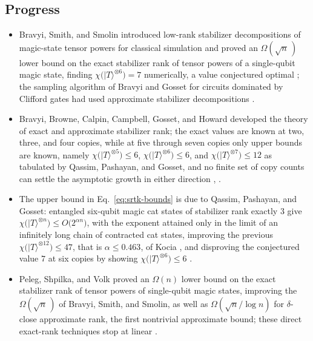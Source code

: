 \subsection*{Progress}

\begin{itemize}
  \item Bravyi, Smith, and Smolin introduced low-rank stabilizer decompositions
  of magic-state tensor powers for classical simulation and proved an
  $\Omega(\sqrt{n}\,)$ lower bound on the exact stabilizer rank of tensor
  powers of a single-qubit magic state, finding
  $\chi\bigl(|T\rangle^{\otimes 6}\bigr) = 7$ numerically, a value
  conjectured optimal ; the sampling algorithm of Bravyi and
  Gosset for circuits dominated by Clifford gates had used approximate
  stabilizer decompositions .

  \item Bravyi, Browne, Calpin, Campbell, Gosset, and Howard developed the theory
  of exact and approximate stabilizer rank; the exact values are known at two, three, and four copies, while at five
  through seven copies only upper bounds are known, namely
  $\chi\bigl(|T\rangle^{\otimes 5}\bigr) \le 6$,
  $\chi\bigl(|T\rangle^{\otimes 6}\bigr) \le 6$, and
  $\chi\bigl(|T\rangle^{\otimes 7}\bigr) \le 12$ as tabulated by Qassim,
  Pashayan, and Gosset, and no finite set of copy counts can settle the
  asymptotic growth in either direction
  ,
  .

  \item The upper bound in Eq.~\eqref{eq:srtk-bounds} is due to Qassim, Pashayan,
  and Gosset: entangled six-qubit magic cat states of stabilizer rank
  exactly $3$ give $\chi\bigl(|T\rangle^{\otimes n}\bigr) \le
  O\bigl(2^{\alpha n}\bigr)$, with the exponent attained only in the limit
  of an infinitely long chain of contracted cat states, improving the previous
  $\chi\bigl(|T\rangle^{\otimes 12}\bigr) \le 47$, that is $\alpha \le
  0.463$, of Kocia , and disproving the
  conjectured value $7$ at six copies by showing
  $\chi\bigl(|T\rangle^{\otimes 6}\bigr) \le 6$
  .

  \item Peleg, Shpilka, and Volk proved an $\Omega(n)$ lower bound on the exact
  stabilizer rank of tensor powers of single-qubit magic states, improving
  the $\Omega(\sqrt{n}\,)$ of Bravyi, Smith, and Smolin, as well as
  $\Omega(\sqrt{n}/\log n)$ for $\delta$-close approximate rank, the
  first nontrivial approximate bound; these direct exact-rank techniques
  stop at linear .


\end{itemize}
